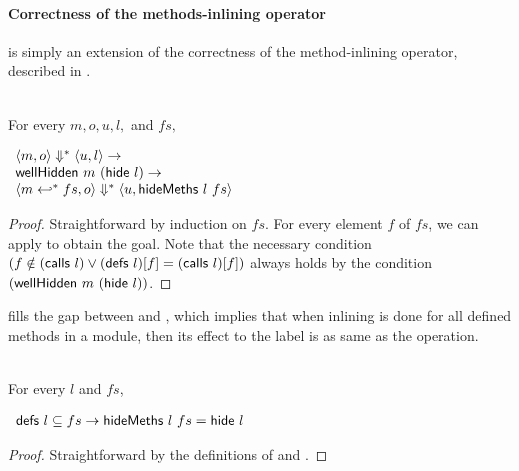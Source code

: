 \paragraph{Correctness of the methods-inlining operator}

 is simply an extension of the correctness
of the method-inlining operator, described in .

\begin{lemma}
  \label{lem-inlinedmssubo}
  \mbox{}\\
  For every $m, o, u, l,$ and $fs,$
  \begin{center}
    \begin{math}
      \begin{array}{l}
        \langle m, o \rangle \Downarrow^{\ast} \langle u, l \rangle \to \\
        \textsf{wellHidden}\ m\ (\textsf{hide}{}\ l) \to \\
        \langle m \hookleftarrow^{\ast}{} fs, o \rangle \Downarrow^{\ast} \langle u, \textsf{hideMeths}{}\ l\ fs \rangle
      \end{array}
    \end{math}
  \end{center}
\end{lemma}
\begin{proof}
  Straightforward by induction on $fs$. For every element $f$ of $fs$,
  we can apply  to obtain the goal. Note that
  the necessary condition $(f \notin (\textsf{calls}\ l) \vee
  (\textsf{defs}\ l)[f] = (\textsf{calls}\ l)[f])$ always holds by the condition
  $(\textsf{wellHidden}\ m\ (\textsf{hide}{}\ l))$.
\end{proof}

 fills the gap between \hidemethssym{} and
\hidesym{}, which implies that when inlining is done for all defined
methods in a module, then its effect to the label is as same as the
\hidesym{} operation.

\begin{lemma}
  \label{lem-hidemeths}
  \mbox{}\\
  For every $l$ and $fs$,
  \begin{center}
    \begin{math}
      \begin{array}{l}
        \textsf{defs}\ l \subseteq fs \to \textsf{hideMeths}{}\ l\ fs = \textsf{hide}{}\ l
      \end{array}
    \end{math}
  \end{center}
\end{lemma}
\begin{proof}
  Straightforward by the definitions of \hidemethssym{} and
  \hidesym{}.
\end{proof}

